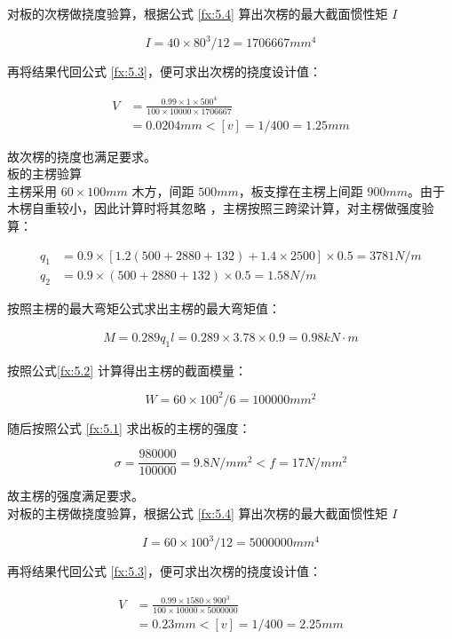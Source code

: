 对板的次楞做挠度验算，根据公式 \ref{fx:5.4} 算出次楞的最大截面惯性矩 $I$

\[
    I=40\times 80^3 /12=1706667 mm^4
\]

再将结果代回公式 \ref{fx:5.3}，便可求出次楞的挠度设计值：

\begin{align*}
    V&=\frac{0.99\times 1 \times 500^4}{100\times 10000\times 1706667}\\
    &=0.0204 mm<[v]=1/400=1.25mm
\end{align*}

故次楞的挠度也满足要求。\\

 板的主楞验算\\

主楞采用 $60\times 100mm$ 木方，间距 $500mm$，板支撑在主楞上间距 $900mm$。由于木楞自重较小，因此计算时将其忽略
，主楞按照三跨梁计算，对主楞做强度验算：

\begin{align*}
    q_1&=0.9\times [1.2(500+2880+132)+1.4\times 2500]\times 0.5=3781 N/m \\
    q_2&=0.9\times (500+2880+132)\times 0.5=1.58 N/m
\end{align*}

按照主楞的最大弯矩公式求出主楞的最大弯矩值：

\begin{align}
    M=0.289q_1l=0.289\times 3.78\times 0.9=0.98 kN \cdot m
\end{align}

按照公式\ref{fx:5.2} 计算得出主楞的截面模量：

\[
    W=60\times 100^2 /6=100000 mm^2
\]

随后按照公式 \ref{fx:5.1} 求出板的主楞的强度：

\[
    \sigma = \frac{980000}{100000}=9.8 N/mm^2< f=17N/mm^2
\]

故主楞的强度满足要求。\\

对板的主楞做挠度验算，根据公式 \ref{fx:5.4} 算出次楞的最大截面惯性矩 $I$

\[
    I=60\times 100^3 /12=5000000 mm^4
\]

再将结果代回公式 \ref{fx:5.3}，便可求出次楞的挠度设计值：

\begin{align*}
    V&=\frac{0.99\times 1580 \times 900^3}{100\times 10000\times 5000000}\\
    &=0.23 mm<[v]=1/400=2.25mm
\end{align*}

